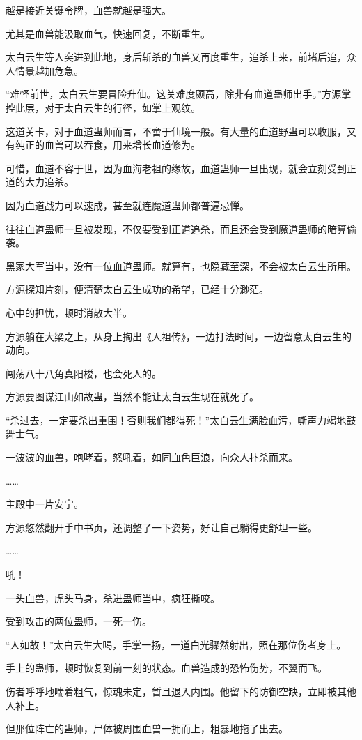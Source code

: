 \begin{this_body}
越是接近关键令牌，血兽就越是强大。

尤其是血兽能汲取血气，快速回复，不断重生。

太白云生等人突进到此地，身后斩杀的血兽又再度重生，追杀上来，前堵后追，众人情景越加危急。

“难怪前世，太白云生要冒险升仙。这关难度颇高，除非有血道蛊师出手。”方源掌控此层，对于太白云生的行径，如掌上观纹。

这道关卡，对于血道蛊师而言，不啻于仙境一般。有大量的血道野蛊可以收服，又有纯正的血兽可以吞食，用来增长血道修为。

可惜，血道不容于世，因为血海老祖的缘故，血道蛊师一旦出现，就会立刻受到正道的大力追杀。

因为血道战力可以速成，甚至就连魔道蛊师都普遍忌惮。

往往血道蛊师一旦被发现，不仅要受到正道追杀，而且还会受到魔道蛊师的暗算偷袭。

黑家大军当中，没有一位血道蛊师。就算有，也隐藏至深，不会被太白云生所用。

方源探知片刻，便清楚太白云生成功的希望，已经十分渺茫。

心中的担忧，顿时消散大半。

方源躺在大梁之上，从身上掏出《人祖传》，一边打法时间，一边留意太白云生的动向。

闯荡八十八角真阳楼，也会死人的。

方源要图谋江山如故蛊，当然不能让太白云生现在就死了。

“杀过去，一定要杀出重围！否则我们都得死！”太白云生满脸血污，嘶声力竭地鼓舞士气。

一波波的血兽，咆哮着，怒吼着，如同血色巨浪，向众人扑杀而来。

……

主殿中一片安宁。

方源悠然翻开手中书页，还调整了一下姿势，好让自己躺得更舒坦一些。

……

吼！

一头血兽，虎头马身，杀进蛊师当中，疯狂撕咬。

受到攻击的两位蛊师，一死一伤。

“人如故！”太白云生大喝，手掌一扬，一道白光骤然射出，照在那位伤者身上。

手上的蛊师，顿时恢复到前一刻的状态。血兽造成的恐怖伤势，不翼而飞。

伤者呼呼地喘着粗气，惊魂未定，暂且退入内围。他留下的防御空缺，立即被其他人补上。

但那位阵亡的蛊师，尸体被周围血兽一拥而上，粗暴地拖了出去。


\end{this_body}
